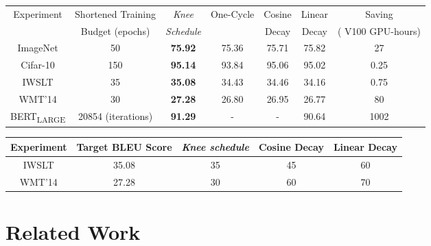 \documentclass{article} \usepackage{iclr2021_conference,times}
\newcommand{\lrschedule}{\textit{Knee schedule}}
\begin{document}
\begin{table*}[ht]
\small
\centering
{\setlength{\extrarowheight}{1pt}

\caption{Shorter budget training: Test accuracy on all learning rate schedules tried in this paper, but trained with a shortened budget. We report same metrics as Table~\ref{tab:all_results_combined}. \lrschedule{} achieves the same accuracy as baseline schedules in much lower budget, saving precious GPU-hours.}


\label{tab:all_results_combined_short}

\begin{tabular}{ccccccc}
\toprule
Experiment  & Shortened Training & \textit{Knee} & One-Cycle & Cosine  & Linear  & Saving  \\
& Budget (epochs) & \textit{Schedule} & &  Decay & Decay & ( V100 GPU-hours) \\
\midrule
ImageNet     &  50 & \textbf{75.92} & 75.36 & 75.71 & 75.82 & 27\\
Cifar-10     & 150 & \textbf{95.14} & 93.84 & 95.06 & 95.02 & 0.25\\
IWSLT        & 35 & \textbf{35.08} & 34.43 & 34.46  & 34.16 & 0.75\\
WMT'14       & 30 & \textbf{27.28} & 26.80 & 26.95  & 26.77 & 80\\
BERT\textsubscript{LARGE} & 20854 (iterations) & \textbf{91.29}  & - & -  & 90.64  & 1002 \\
\bottomrule
\end{tabular}}
\end{table*}
\vspace{-12pt}

\begin{table*}[ht]
\small
\centering
\caption{Epochs required by different LR schedules to reach the target accuracy.}
{\setlength{\extrarowheight}{1pt}\begin{tabular}{ccccc}
\toprule
Experiment & Target BLEU Score & \lrschedule{} & Cosine Decay & Linear Decay \\ 
\midrule
IWSLT       & 35.08 & 35 & 45 & 60 \\
WMT'14      & 27.28 & 30 & 60 & 70  \\ 
\bottomrule
\end{tabular}}

\label{tab:target_accuracy_epochs}
\vspace{-10pt}
\end{table*} \section{Related Work}
\label{sec:related_work}
\end{document}
